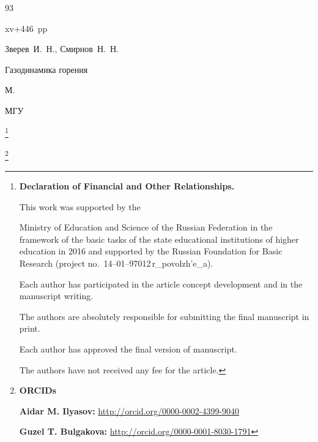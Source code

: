 \begin{thebibliography}{93}

xv+446~pp





\by Зверев~И.~Н., Смирнов~Н.~Н.

\book Газодинамика горения

\publaddr М.

\publ МГУ





\end{thebibliography}



\RuDate



\newpage



\makeentitle



\thanks{{\bf Declaration of Financial and Other Relationships.}

This work was supported by the 

Ministry of Education and Science of the Russian Federation in the framework of the basic tasks of the state educational institutions of higher education in 2016  and supported by the Russian Foundation for Basic Research (project no.~14--01--97012\,r\_povolzh'e\_a).

Each author has participated in the article concept development and in the manuscript writing.

The authors are absolutely responsible for submitting the final manuscript in print.

Each author has approved the final version of manuscript.

The authors have not received any fee for the article.

}



\pagebreak



\thanks{{\bf ORCIDs}



{\bf  Aidar M. Ilyasov:}    \url{http://orcid.org/0000-0002-4399-9040}



{\bf Guzel T. Bulgakova:}    \url{http://orcid.org/0000-0001-8030-1791}

}







